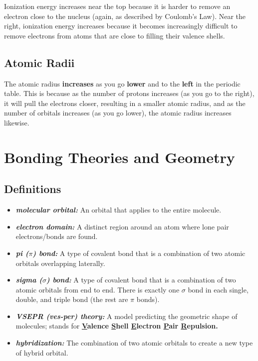 \documentclass[a4paper, 12pt]{article}
\begin{document}
Ionization energy increases near the top because it is harder to remove an electron close to the nucleus (again, as described by Coulomb's Law). Near the right, ionization energy increases because it becomes increasingly difficult to remove electrons from atoms that are close to filling their valence shells.

\subsection{Atomic Radii}
The atomic radius \textbf{increases} as you go \textbf{lower} and to the \textbf{left} in the periodic table. This is because as the number of protons increases (as you go to the right), it will pull the electrons closer, resulting in a smaller atomic radius, and as the number of orbitals increases (as you go lower), the atomic radius increases likewise.

\section{Bonding Theories and Geometry}

\subsection{Definitions}
\begin{itemize}[leftmargin=*, nosep]
    \item \textbf{\textit{molecular orbital:}} An orbital that applies to the entire molecule.
    \item \textbf{\textit{electron domain:}} A distinct region around an atom where lone pair electrons/bonds are found.
    \item \textbf{\textit{pi ($\pi$) bond:}} A type of covalent bond that is a combination of two atomic orbitals overlapping laterally.
    \item \textbf{\textit{sigma ($\sigma$) bond:}} A type of covalent bond that is a combination of two atomic orbitals from end to end. There is exactly one $\sigma$ bond in each single, double, and triple bond (the rest are $\pi$ bonds).
    \item \textbf{\textit{VSEPR (ves-per) theory:}} A model predicting the geometric shape of molecules; stands for \textbf{\underline{V}alence \underline{S}hell \underline{E}lectron \underline{P}air \underline{R}epulsion.}
    \item \textbf{\textit{hybridization:}} The combination of two atomic orbitals to create a new type of hybrid orbital.

\end{itemize}
\end{document}
